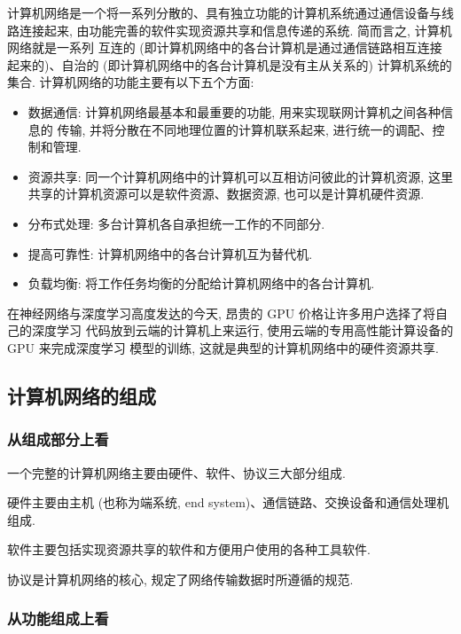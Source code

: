\documentclass[10pt,UTF8]{book} %
\begin{document}
计算机网络是一个将一系列分散的、具有独立功能的计算机系统通过通信设备与线路连接起来,
由功能完善的软件实现资源共享和信息传递的系统. 简而言之, 计算机网络就是一系列
互连的 (即计算机网络中的各台计算机是通过通信链路相互连接起来的)、自治的
(即计算机网络中的各台计算机是没有主从关系的) 计算机系统的集合.
计算机网络的功能主要有以下五个方面:
\begin{itemize}[itemsep=0pt]
    \item 数据通信: 计算机网络最基本和最重要的功能, 用来实现联网计算机之间各种信息的
    传输, 并将分散在不同地理位置的计算机联系起来, 进行统一的调配、控制和管理.
    \item 资源共享: 同一个计算机网络中的计算机可以互相访问彼此的计算机资源, 这里
    共享的计算机资源可以是软件资源、数据资源, 也可以是计算机硬件资源.
    \item 分布式处理: 多台计算机各自承担统一工作的不同部分.
    \item 提高可靠性: 计算机网络中的各台计算机互为替代机.
    \item 负载均衡: 将工作任务均衡的分配给计算机网络中的各台计算机.
\end{itemize}

\begin{example}
    在神经网络与深度学习高度发达的今天, 昂贵的 GPU 价格让许多用户选择了将自己的深度学习
    代码放到云端的计算机上来运行, 使用云端的专用高性能计算设备的 GPU 来完成深度学习
    模型的训练, 这就是典型的计算机网络中的硬件资源共享.
\end{example}

\subsection{计算机网络的组成}

\subsubsection{从组成部分上看}

一个完整的计算机网络主要由硬件、软件、协议三大部分组成.

硬件主要由主机 (也称为端系统, end system)、通信链路、交换设备和通信处理机组成.

软件主要包括实现资源共享的软件和方便用户使用的各种工具软件.

协议是计算机网络的核心, 规定了网络传输数据时所遵循的规范.

\subsubsection{从功能组成上看}
\end{document}
